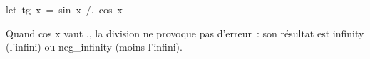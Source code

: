 {\begin{minipage}{\myparboxwidth}
{
\parindent {}
\medskip
\mbox{\blc  \blk\idt  \mcl let\idt \ tg\ x\ =\ sin\ x\ /.\ cos\ x}\par 
}

\noindent Quand {\idt cos x} vaut {.}, la division ne provoque pas d'erreur~: son résultat est
{\idt infinity} (l'infini) ou {\idt neg\_infinity} (moins l'infini).

\vspace{\abovedisplayskip}
\end{minipage}
}

